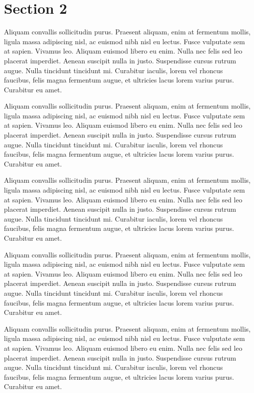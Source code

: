 \documentclass[twoside]{report}
\begin{document}
\section{Section 2}

Aliquam convallis sollicitudin purus. Praesent aliquam, enim at fermentum mollis, ligula massa adipiscing nisl, ac euismod nibh nisl eu lectus. Fusce vulputate sem at sapien. Vivamus leo. Aliquam euismod libero eu enim. Nulla nec felis sed leo placerat imperdiet. Aenean suscipit nulla in justo. Suspendisse cursus rutrum augue. Nulla tincidunt tincidunt mi. Curabitur iaculis, lorem vel rhoncus faucibus, felis magna fermentum augue, et ultricies lacus lorem varius purus. Curabitur eu amet.

\vspace{10pt}

Aliquam convallis sollicitudin purus. Praesent aliquam, enim at fermentum mollis, ligula massa adipiscing nisl, ac euismod nibh nisl eu lectus. Fusce vulputate sem at sapien. Vivamus leo. Aliquam euismod libero eu enim. Nulla nec felis sed leo placerat imperdiet. Aenean suscipit nulla in justo. Suspendisse cursus rutrum augue. Nulla tincidunt tincidunt mi. Curabitur iaculis, lorem vel rhoncus faucibus, felis magna fermentum augue, et ultricies lacus lorem varius purus. Curabitur eu amet.

Aliquam convallis sollicitudin purus. Praesent aliquam, enim at fermentum mollis, ligula massa adipiscing nisl, ac euismod nibh nisl eu lectus. Fusce vulputate sem at sapien. Vivamus leo. Aliquam euismod libero eu enim. Nulla nec felis sed leo placerat imperdiet. Aenean suscipit nulla in justo. Suspendisse cursus rutrum augue. Nulla tincidunt tincidunt mi. Curabitur iaculis, lorem vel rhoncus faucibus, felis magna fermentum augue, et ultricies lacus lorem varius purus. Curabitur eu amet.

Aliquam convallis sollicitudin purus. Praesent aliquam, enim at fermentum mollis, ligula massa adipiscing nisl, ac euismod nibh nisl eu lectus. Fusce vulputate sem at sapien. Vivamus leo. Aliquam euismod libero eu enim. Nulla nec felis sed leo placerat imperdiet. Aenean suscipit nulla in justo. Suspendisse cursus rutrum augue. Nulla tincidunt tincidunt mi. Curabitur iaculis, lorem vel rhoncus faucibus, felis magna fermentum augue, et ultricies lacus lorem varius purus. Curabitur eu amet.

Aliquam convallis sollicitudin purus. Praesent aliquam, enim at fermentum mollis, ligula massa adipiscing nisl, ac euismod nibh nisl eu lectus. Fusce vulputate sem at sapien. Vivamus leo. Aliquam euismod libero eu enim. Nulla nec felis sed leo placerat imperdiet. Aenean suscipit nulla in justo. Suspendisse cursus rutrum augue. Nulla tincidunt tincidunt mi. Curabitur iaculis, lorem vel rhoncus faucibus, felis magna fermentum augue, et ultricies lacus lorem varius purus. Curabitur eu amet.
\end{document}
